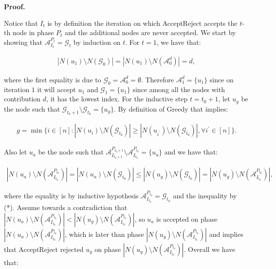 \documentclass[10pt,a4paper]{article}
\begin{document}



\par\medskip\noindent\textbf{Proof.}\par



Notice that $I_{t}$ is by definition the iteration on which AcceptReject accepts the $t$-th node in phase $P_{t}$ and the additional nodes are never accepted.
We start by showing that $\mathcal{A}^{P_{t}}_{I_{t}}=\mathcal{G}_{t}$ by induction on $t$.
For $t=1$, we have that:\par


\[\begin{gathered}
\displaystyle|N(u_{1})\setminus N(\mathcal{G}_{0})|=|N(u_{1})\setminus N(\mathcal{A}^{d}_{0})|=d,
\end{gathered}\]


where the first equality is due to $\mathcal{G}_{0}=\mathcal{A}^{d}_{0}=\emptyset$.
Therefore $\mathcal{A}^{d}_{1}=\{u_{1}\}$ since on iteration $1$ it will accept $u_{1}$ and $\mathcal{G}_{1}=\{u_{1}\}$ since among all the nodes with contribution $d$, it has the lowest index.
For the inductive step $t=t_{0}+1$, let $u_{g}$ be the node such that $\mathcal{G}_{t_{0}+1}\setminus\mathcal{G}_{t_{0}}=\{u_{g}\}$.
By definition of Greedy that implies:\par


\[\begin{gathered}
\displaystyle g=\min\{i\in[n]:|N(u_{i})\setminus N(\mathcal{G}_{t_{0}})|\geq|N(u_{i^{\prime}})\setminus N(\mathcal{G}_{t_{0}})|,\forall i^{\prime}\in[n]\}.
\end{gathered}\]


Also let $u_{a}$ be the node such that $\mathcal{A}^{P_{t_{0}+1}}_{I_{t_{0}+1}}\setminus\mathcal{A}^{P_{t_{0}}}_{I_{t_{0}}}=\{u_{a}\}$ and we have that:\par


\[\begin{gathered}
\displaystyle|N(u_{a})\setminus N(\mathcal{A}^{P_{t_{0}}}_{I_{t_{0}}})|=|N(u_{a})\setminus N(\mathcal{G}_{t_{0}})|\leq|N(u_{g})\setminus N(\mathcal{G}_{t_{0}})|=|N(u_{g})\setminus N(\mathcal{A}^{P_{t_{0}}}_{I_{t_{0}}})|,
\end{gathered}\]


where the equality is by inductive hypothesis $\mathcal{A}^{P_{t_{0}}}_{I_{t_{0}}}=\mathcal{G}_{t_{0}}$ and the inequality by (*).
Assume towards a contradiction that $|N(u_{a})\setminus N(\mathcal{A}^{P_{t_{0}}}_{I_{t_{0}}})|<|N(u_{g})\setminus N(\mathcal{A}^{P_{t_{0}}}_{I_{t_{0}}})|$, so $u_{a}$ is accepted on phase $|N(u_{a})\setminus N(\mathcal{A}^{P_{t_{0}}}_{I_{t_{0}}})|$, which is later than phase $|N(u_{g})\setminus N(\mathcal{A}^{P_{t_{0}}}_{I_{t_{0}}})|$ and implies that AcceptReject rejected $u_{g}$ on phase $|N(u_{g})\setminus N(\mathcal{A}^{P_{t_{0}}}_{I_{t_{0}}})|$.
Overall we have that:\par
\end{document}
